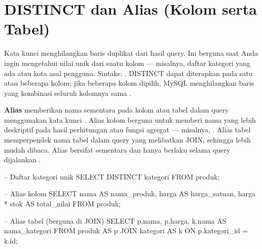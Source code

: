 \section{DISTINCT dan Alias (Kolom serta Tabel)}

Kata kunci  menghilangkan baris duplikat dari hasil query. Ini berguna saat Anda ingin mengetahui nilai unik dari suatu kolom --- misalnya, daftar kategori yang ada atau kota asal pengguna. Sintaks: . DISTINCT dapat diterapkan pada satu atau beberapa kolom; jika beberapa kolom dipilih, MySQL menghilangkan baris yang kombinasi seluruh kolomnya sama \cite{mysqlDocs}.

\textbf{Alias} memberikan nama sementara pada kolom atau tabel dalam query menggunakan kata kunci . Alias kolom berguna untuk memberi nama yang lebih deskriptif pada hasil perhitungan atau fungsi agregat --- misalnya, . Alias tabel memperpendek nama tabel dalam query yang melibatkan JOIN, sehingga lebih mudah dibaca. Alias bersifat sementara dan hanya berlaku selama query dijalankan \cite{mysqlGettingStarted}.

\begin{webcode}[language=SQL, caption={DISTINCT dan alias}]
-- Daftar kategori unik
SELECT DISTINCT kategori FROM produk;

-- Alias kolom
SELECT nama AS nama_produk,
       harga AS harga_satuan,
       harga * stok AS total_nilai
FROM produk;

-- Alias tabel (berguna di JOIN)
SELECT p.nama, p.harga, k.nama AS nama_kategori
FROM produk AS p
JOIN kategori AS k ON p.kategori_id = k.id;
\end{webcode}

